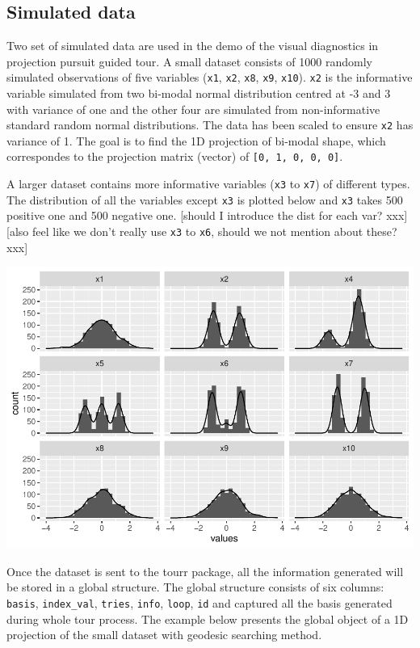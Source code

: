 \documentclass[12pt]{article}
\begin{document}
\hypertarget{simulated-data}{%
\subsection{Simulated data}\label{simulated-data}}

Two set of simulated data are used in the demo of the visual diagnostics
in projection pursuit guided tour. A small dataset consists of 1000
randomly simulated observations of five variables (\texttt{x1},
\texttt{x2}, \texttt{x8}, \texttt{x9}, \texttt{x10}). \texttt{x2} is the
informative variable simulated from two bi-modal normal distribution
centred at -3 and 3 with variance of one and the other four are
simulated from non-informative standard random normal distributions. The
data has been scaled to ensure \texttt{x2} has variance of 1. The goal
is to find the 1D projection of bi-modal shape, which correspondes to
the projection matrix (vector) of \texttt{{[}0,\ 1,\ 0,\ 0,\ 0{]}}.

A larger dataset contains more informative variables (\texttt{x3} to
\texttt{x7}) of different types. The distribution of all the variables
except \texttt{x3} is plotted below and \texttt{x3} takes 500 positive
one and 500 negative one. {[}should I introduce the dist for each var?
xxx{]} {[}also feel like we don't really use \texttt{x3} to \texttt{x6},
should we not mention about these? xxx{]}

\includegraphics{paper_files/figure-latex/origin-data-1.pdf}

Once the dataset is sent to the tourr package, all the information
generated will be stored in a global structure. The global structure
consists of six columns: \texttt{basis}, \texttt{index\_val},
\texttt{tries}, \texttt{info}, \texttt{loop}, \texttt{id} and captured
all the basis generated during whole tour process. The example below
presents the global object of a 1D projection of the small dataset with
geodesic searching method.
\end{document}
